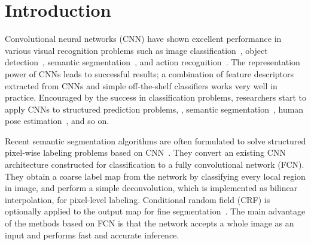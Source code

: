 \documentclass[10pt,twocolumn,letterpaper]{article}
\begin{document}
\section{Introduction}
\label{sec:introduction}
Convolutional neural networks (CNN) have shown excellent performance in various visual recognition problems such as image classification~\cite{Alexnet,Vgg16,Googlenet}, object detection~\cite{Rcnn,Sds}, semantic segmentation~\cite{Farabet,Zoomout}, and action recognition~\cite{JiTPAMI13,SimonyanNIPS2014}.
The representation power of CNNs leads to successful results; a combination of feature descriptors extracted from CNNs and simple off-the-shelf classifiers works very well in practice.
Encouraged by the success in classification problems, researchers start to apply CNNs to structured prediction problems, \ie, semantic segmentation~\cite{Fcn,Deeplabcrf}, human pose estimation~\cite{LiACCV14}, and so on.


Recent semantic segmentation algorithms are often formulated to solve structured pixel-wise labeling problems based on CNN~\cite{Deeplabcrf,Fcn}. 
They convert an existing CNN architecture constructed for classification to a fully convolutional network (FCN).
They obtain a coarse label map from the network by classifying every local region in image, and perform a simple deconvolution, which is implemented as bilinear interpolation, for pixel-level labeling.
Conditional random field (CRF) is optionally applied to the output map for fine segmentation~\cite{Fullycrf}.
The main advantage of the methods based on FCN is that the network accepts a whole image as an input and performs fast and accurate inference.
\end{document}
